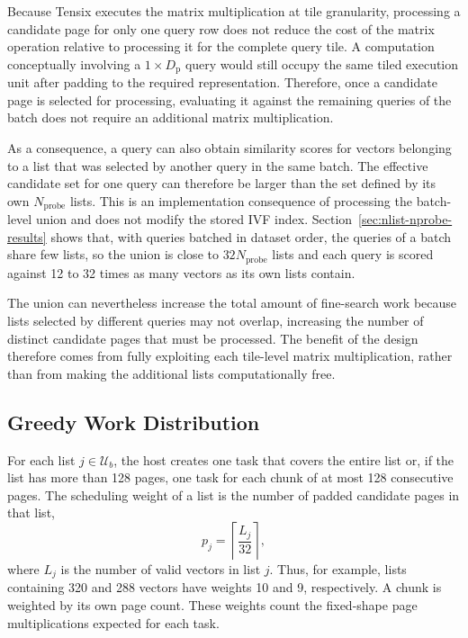 Because Tensix executes the matrix multiplication at tile granularity, processing a candidate page for only one query row does not reduce the cost of the matrix operation relative to processing it for the complete query tile. A computation conceptually involving a \(1\times D_{\mathrm{p}}\) query would still occupy the same tiled execution unit after padding to the required representation. Therefore, once a candidate page is selected for processing, evaluating it against the remaining queries of the batch does not require an additional matrix multiplication.

As a consequence, a query can also obtain similarity scores for vectors belonging to a list that was selected by another query in the same batch. The effective candidate set for one query can therefore be larger than the set defined by its own \(N_{\mathrm{probe}}\) lists. This is an implementation consequence of processing the batch-level union and does not modify the stored IVF index. Section~\ref{sec:nlist-nprobe-results} shows that, with queries batched in dataset order, the queries of a batch share few lists, so the union is close to \(32N_{\mathrm{probe}}\) lists and each query is scored against 12 to 32 times as many vectors as its own lists contain.

The union can nevertheless increase the total amount of fine-search work because lists selected by different queries may not overlap, increasing the number of distinct candidate pages that must be processed. The benefit of the design therefore comes from fully exploiting each tile-level matrix multiplication, rather than from making the additional lists computationally free.

\subsection{Greedy Work Distribution}
\label{subsec:greedy-work-distribution}

For each list \(j\in\mathcal{U}_b\), the host creates one task that covers the entire list or, if the list has more than 128 pages, one task for each chunk of at most 128 consecutive pages. The scheduling weight of a list is the number of padded candidate pages in that list, \begin{equation} p_j=\left\lceil\frac{L_j}{32}\right\rceil, \label{eq:list-scheduling-weight} \end{equation} where \(L_j\) is the number of valid vectors in list \(j\). Thus, for example, lists containing 320 and 288 vectors have weights 10 and 9, respectively. A chunk is weighted by its own page count. These weights count the fixed-shape page multiplications expected for each task.

